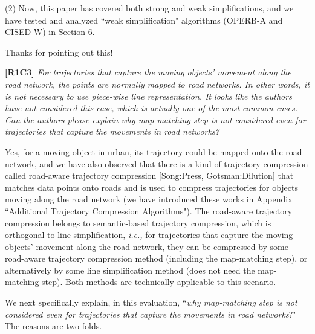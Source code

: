 \documentclass{letter}
\newcommand{\ie}{\emph{i.e.,}\xspace}
\begin{document}
(2) Now, this paper has covered both strong and weak simplifications, and we have tested and analyzed ``weak simplification" algorithms (OPERB-A and CISED-W) in Section 6. 

Thanks for pointing out this!

\textbf{[R1C3]} \emph{For trajectories that capture the moving objects' movement along the road network, the points are normally mapped to road networks. In other words, it is not necessary to use piece-wise line representation. It looks like the authors have not considered this case, which is actually one of the most common cases. Can the authors please explain why map-matching step is not considered even for trajectories that capture the movements in road networks?}

Yes, for a moving object in urban, its trajectory could be mapped onto the road network, and we have also observed that there is a kind of trajectory compression called road-aware trajectory compression [Song:Press, Gotsman:Dilution] that matches data points onto roads and is used to compress trajectories for objects moving along the road network (we have introduced these works in Appendix ``Additional Trajectory Compression Algorithms"). The road-aware trajectory compression belongs to semantic-based trajectory compression, which is orthogonal to line simplification, \ie for trajectories that capture the moving objects' movement along the road network, they can be compressed by some road-aware trajectory compression method (including the map-matching step), or alternatively by some line simplification method (does not need the map-matching step). Both methods are technically applicable to this scenario. 


We next specifically explain, in this evaluation, ``\emph{why map-matching step is not considered even for trajectories that capture the movements in road networks}?"
The reasons are two folds.
\end{document}
